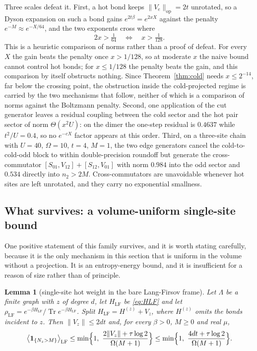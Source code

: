 \documentclass[11pt]{article}
\newtheorem{lemma}[theorem]{Lemma}
\theoremstyle{definition}
\theoremstyle{remark}
\DeclareMathOperator{\Tr}{Tr}
\newcommand{\LF}{\mathrm{LF}}
\begin{document}
Three scales defeat it. First, a hot bond keeps $\|V_{e}\|_{\mathrm{op}}=2t$
unrotated, so a Dyson expansion on such a bond gains $e^{2t\beta}=e^{2xX}$ against
the penalty $e^{-M}\approx e^{-X/64}$, and the two exponents cross where
\begin{equation}
2x>\tfrac1{64}\quad\Longleftrightarrow\quad x>\tfrac1{128}.
\label{eq:threshold}
\end{equation}
This is a heuristic comparison of norms rather than a proof of defeat. For every
$X$ the gain beats the penalty once $x>1/128$, so at moderate $x$ the naive bound
cannot control hot bonds; for $x\le1/128$ the penalty beats the gain, and this
comparison by itself obstructs nothing. Since Theorem~\ref{thm:cold} needs
$x\le2^{-14}$, far below the crossing point, the obstruction inside the
cold-projected regime is carried by the two mechanisms that follow, neither of
which is a comparison of norms against the Boltzmann penalty. Second, one
application of the cut generator leaves a
residual coupling between the cold sector and the hot pair sector of norm
$\Theta(x^{2}U)$: on the dimer the one-step residual is $0.4637$ while
$t^{2}/U=0.4$, so no $e^{-cX}$ factor appears at this order. Third, on a three-site
chain with $U=40$, $\Omega=10$, $t=4$, $M=1$, the two edge generators cancel the
cold-to-cold-odd block to within double-precision roundoff but generate the
cross-commutator
$[S_{01},V_{12}]+[S_{12},V_{01}]$ with norm $0.984$ into the odd sector and
$0.534$ directly into $n_{2}>2M$. Cross-commutators are unavoidable whenever hot
sites are left unrotated, and they carry no exponential smallness.

\subsection{What survives: a volume-uniform single-site bound}

One positive statement of this family survives, and it is worth stating
carefully, because it is the only mechanism in this section that is uniform in
the volume without a projection. It is an entropy-energy bound, and it is
insufficient for a reason of size rather than of principle.

\begin{lemma}[single-site hot weight in the bare Lang-Firsov frame]
\label{lem:relent}
Let $\Lambda$ be a finite graph with $z$ of degree $d$, let $H_{\LF}$ be
\eqref{eq:HLF} and let $\rho_{\LF}=e^{-\beta H_{\LF}}/\Tr e^{-\beta H_{\LF}}$.
Split $H_{\LF}=H^{(z)}+V_{z}$, where $H^{(z)}$ omits the bonds incident to $z$.
Then $\|V_{z}\|\le 2dt$ and, for every $\beta>0$, $M\ge0$ and real $\mu$,
\begin{equation}
\bigl\langle\mathbf{1}_{\{N_{z}>M\}}\bigr\rangle_{\LF}
\le\min\Bigl\{1,\ \frac{2\|V_{z}\|+\tau\log2}{\Omega(M+1)}\Bigr\}
\le\min\Bigl\{1,\ \frac{4dt+\tau\log2}{\Omega(M+1)}\Bigr\}.
\label{eq:relent-bound}
\end{equation}
\end{lemma}
\end{document}

